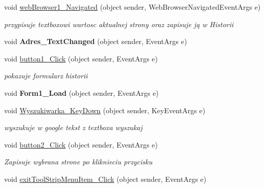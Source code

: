 \begin{DoxyCompactItemize}
void \mbox{\hyperlink{class_proj__przegladarka_1_1_form1_a163389d3e2bd2a665bbcc320d98519a1}{web\+Browser1\+\_\+\+Navigated}} (object sender, Web\+Browser\+Navigated\+Event\+Args e)
\begin{DoxyCompactList}\small\item\em przypisuje textboxowi wartosc aktualnej strony oraz zapisuje ją w Historii \end{DoxyCompactList}\item 
\mbox{\label{class_proj__przegladarka_1_1_form1_a88b7f5b1dcc7b9cd98fe0065916017d5}} 
void {\bfseries Adres\+\_\+\+Text\+Changed} (object sender, Event\+Args e)
\item 
\mbox{\label{class_proj__przegladarka_1_1_form1_a16f80e5a2c495b467f547dd64274a186}} 
void \mbox{\hyperlink{class_proj__przegladarka_1_1_form1_a16f80e5a2c495b467f547dd64274a186}{button1\+\_\+\+Click}} (object sender, Event\+Args e)
\begin{DoxyCompactList}\small\item\em pokazuje formularz historii \end{DoxyCompactList}\item 
\mbox{\label{class_proj__przegladarka_1_1_form1_afb3553ec6e7d1efcb2a16a5bcf282771}} 
void {\bfseries Form1\+\_\+\+Load} (object sender, Event\+Args e)
\item 
void \mbox{\hyperlink{class_proj__przegladarka_1_1_form1_a3aa0f9559486fa35673dfce6387aa615}{Wyszukiwarka\+\_\+\+Key\+Down}} (object sender, Key\+Event\+Args e)
\begin{DoxyCompactList}\small\item\em wyszukuje w google tekst z textboxa wyszukaj \end{DoxyCompactList}\item 
void \mbox{\hyperlink{class_proj__przegladarka_1_1_form1_aacf6a593abf9b098a8c5e5fcce42d938}{button2\+\_\+\+Click}} (object sender, Event\+Args e)
\begin{DoxyCompactList}\small\item\em Zapisuje wybrana strone po kliknieciu przycisku \end{DoxyCompactList}\item 
void \mbox{\hyperlink{class_proj__przegladarka_1_1_form1_a2e0e6d1e396b7362aa371d16c1d598a2}{exit\+Tool\+Strip\+Menu\+Item\+\_\+\+Click}} (object sender, Event\+Args e)

\end{DoxyCompactItemize}
